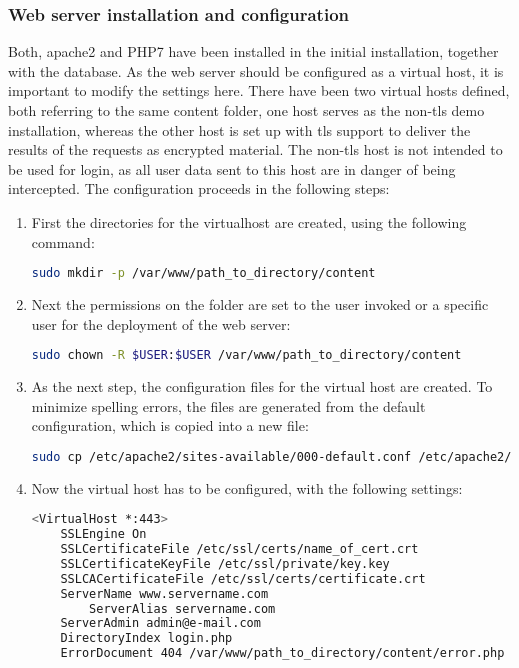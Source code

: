 \subsubsection{Web server installation and configuration}
Both, apache2 and PHP7 have been installed in the initial installation, together with the database. As the web server should be configured as a virtual host, it is important to 
modify the settings here. There have been two virtual hosts defined, both referring to the same content folder, one host serves as the non-tls demo installation, whereas the other
host is set up with tls support to deliver the results of the requests as encrypted material. The non-tls host is not intended to be used for login, as all user data sent to this host
are in danger of being intercepted. The configuration proceeds in the following steps:
\begin{enumerate}
 \item First the directories for the virtualhost are created, using the following command:
 \begin{lstlisting}[language=bash]
  sudo mkdir -p /var/www/path_to_directory/content
 \end{lstlisting}
 \item Next the permissions on the folder are set to the user invoked or a specific user for the deployment of the web server:
 \begin{lstlisting}[language=bash]
  sudo chown -R $USER:$USER /var/www/path_to_directory/content
 \end{lstlisting}
 \item As the next step, the configuration files for the virtual host are created. To minimize spelling errors, the files are generated from the default configuration, which is 
 copied into a new file:
 \begin{lstlisting}[language=bash]
  sudo cp /etc/apache2/sites-available/000-default.conf /etc/apache2/sites-available/name_virtual_host.conf
 \end{lstlisting}
 \item Now the virtual host has to be configured, with the following settings:
 \begin{lstlisting}[language=bash]
  <VirtualHost *:443>
	SSLEngine On
	SSLCertificateFile /etc/ssl/certs/name_of_cert.crt
	SSLCertificateKeyFile /etc/ssl/private/key.key
	SSLCACertificateFile /etc/ssl/certs/certificate.crt
	ServerName www.servername.com
        ServerAlias servername.com
	ServerAdmin admin@e-mail.com
	DirectoryIndex login.php
	ErrorDocument 404 /var/www/path_to_directory/content/error.php

\end{lstlisting}
\end{enumerate}

